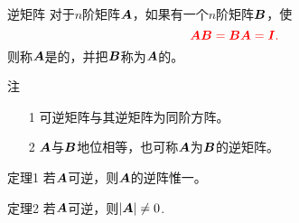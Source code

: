 \begin{frame}
  \begin{footnotesize}
    \begin{block}{逆矩阵}
      对于$n$阶矩阵$\boldsymbol{A}$，如果有一个$n$阶矩阵$\boldsymbol{B}$，使
      $$
      \textcolor{red}{
        \boldsymbol{A}\boldsymbol{B} = \boldsymbol{B}\boldsymbol{A} = \boldsymbol{I}.
      }
      $$
      则称$\boldsymbol{A}$是的，并把$\boldsymbol{B}$称为$\boldsymbol{A}$的。
    \end{block}
    \pause
    
    \begin{block}{注}
      \begin{itemize}
      \item[1] 可逆矩阵与其逆矩阵为同阶方阵。
      \item[2] $\boldsymbol{A}$与$\boldsymbol{B}$地位相等，也可称$\boldsymbol{A}$为$\boldsymbol{B}$的逆矩阵。      
      \end{itemize}
    \end{block}
  \end{footnotesize}
\end{frame}


\begin{frame}
  \begin{footnotesize}
    \begin{block}{定理1}
      若$\boldsymbol{A}$可逆，则$\boldsymbol{A}$的逆阵惟一。
    \end{block}
    \pause
    \proofname


    \pause 
    \vspace{2.cm}
  \end{footnotesize}
\end{frame}

\begin{frame}
  \begin{footnotesize}
    \begin{block}{定理2}
      若$\boldsymbol{A}$可逆，则$|\boldsymbol{A}|\ne 0$.
    \end{block}
    \pause
    \proofname


  \end{footnotesize}
\end{frame}

